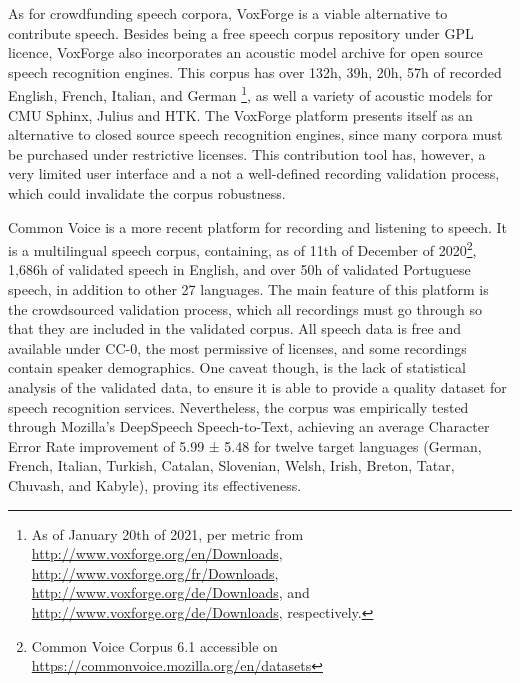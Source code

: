 As for crowdfunding speech corpora, VoxForge \cite{voxforge} is a viable alternative to contribute speech. Besides being a free speech corpus repository under GPL licence, VoxForge also incorporates an acoustic model archive for open source speech recognition engines. This corpus has over 132h, 39h, 20h, 57h of recorded English, French, Italian, and German \footnote{As of January 20th of 2021, per metric from \url{http://www.voxforge.org/en/Downloads}, \url{http://www.voxforge.org/fr/Downloads}, \url{http://www.voxforge.org/de/Downloads}, and \url{http://www.voxforge.org/de/Downloads}, respectively.}, as well a variety of acoustic models for CMU Sphinx, Julius and HTK. The VoxForge platform presents itself as an alternative to closed source speech recognition engines, since many corpora must be purchased under restrictive licenses. This contribution tool has, however, a very limited user interface and a not a well-defined recording validation process, which could invalidate the corpus robustness.

Common Voice \cite{ardila2019common} is a more recent platform for recording and listening to speech. It is a multilingual speech corpus, containing, as of 11th of December of 2020\footnote{Common Voice Corpus 6.1 accessible on  \url{https://commonvoice.mozilla.org/en/datasets}}, 1,686h of validated speech in English, and over 50h of validated Portuguese speech, in addition to other 27 languages. The main feature of this platform is the crowdsourced validation process, which all recordings must go through so that they are included in the validated corpus. All speech data is free and available under CC-0, the most permissive of licenses, and some recordings contain speaker demographics. One caveat though, is the lack of statistical analysis of the validated data, to ensure it is able to provide a quality dataset for speech recognition services. Nevertheless, the corpus was empirically tested through Mozilla’s DeepSpeech Speech-to-Text, achieving an average Character Error Rate improvement of 5.99 ± 5.48 for twelve target languages (German, French, Italian, Turkish, Catalan, Slovenian, Welsh, Irish, Breton, Tatar, Chuvash, and Kabyle), proving its effectiveness.